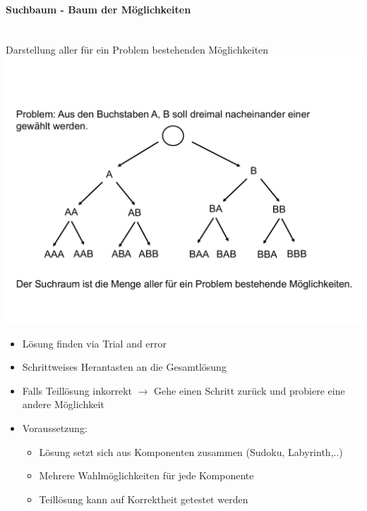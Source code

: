 \documentclass[
    ngerman,
    color=3b,
    dark_mode,
    load_common, %
    summary,
    boxarc,
]{tuda_summary}
\begin{document}
\paragraph{Suchbaum - Baum der Möglichkeiten}\mbox{}\\
Darstellung aller für ein Problem bestehenden Möglichkeiten\\
\includegraphics[width=14cm]{pictures/suchbaum.pdf}
\begin{idea}[Backtracking]\mbox{}
    \begin{itemize}
        \item Lösung finden via Trial and error
        \item Schrittweises Herantasten an die Gesamtlösung
        \item Falls Teillösung inkorrekt $\rightarrow$ Gehe einen Schritt zurück und probiere eine andere Möglichkeit
        \item Voraussetzung:
              \begin{itemize}
                  \item Lösung setzt sich aus Komponenten zusammen (Sudoku, Labyrinth,..)
                  \item Mehrere Wahlmöglichkeiten für jede Komponente
                  \item Teillösung kann auf Korrektheit getestet werden
              \end{itemize}
    \end{itemize}
\end{idea}
\end{document}
